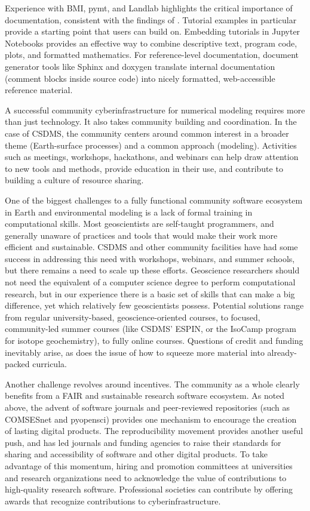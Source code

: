 \documentclass[journal abbreviation, manuscript]{copernicus}
\begin{document}
Experience with BMI, pymt, and Landlab highlights the critical importance of documentation, consistent with the findings of \citet{lawrence2015science}. Tutorial examples in particular provide a starting point that users can build on. Embedding tutorials in Jupyter Notebooks provides an effective way to combine descriptive text, program code, plots, and formatted mathematics. For reference-level documentation, document generator tools like Sphinx and doxygen translate internal documentation (comment blocks inside source code) into nicely formatted, web-accessible reference material.

A successful community cyberinfrastructure for numerical modeling requires more than just technology. It also takes community building and coordination. In the case of CSDMS, the community centers around common interest in a broader theme (Earth-surface processes) and a common approach (modeling). Activities such as meetings, workshops, hackathons, and webinars can help draw attention to new tools and methods, provide education in their use, and contribute to building a culture of resource sharing.

One of the biggest challenges to a fully functional community software ecosystem in Earth and environmental modeling is a lack of formal training in computational skills. Most geoscientists are self-taught programmers, and generally unaware of practices and tools that would make their work more efficient and sustainable. CSDMS and other community facilities have had some success in addressing this need with workshops, webinars, and summer schools, but there remains a need to scale up these efforts. Geoscience researchers should not need the equivalent of a computer science degree to perform computational research, but in our experience there is a basic set of skills that can make a big difference, yet which relatively few geoscientists possess. Potential solutions range from regular university-based, geoscience-oriented courses, to focused, community-led summer courses (like CSDMS' ESPIN, or the IsoCamp program for isotope geochemistry), to fully online courses. Questions of credit and funding inevitably arise, as does the issue of how to squeeze more material into already-packed curricula.  

Another challenge revolves around incentives. The community as a whole clearly benefits from a FAIR and sustainable research software ecosystem. As noted above, the advent of software journals and peer-reviewed repositories (such as COMSESnet and pyopensci) provides one mechanism to encourage the creation of lasting digital products. The reproducibility movement provides another useful push, and has led journals and funding agencies to raise their standards for sharing and accessibility of software and other digital products. To take advantage of this momentum, hiring and promotion committees at universities and research organizations need to acknowledge the value of contributions to high-quality research software. Professional societies can contribute by offering awards that recognize contributions to cyberinfrastructure.
\end{document}
